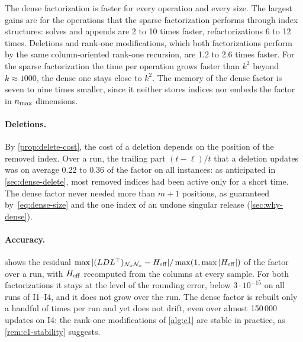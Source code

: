 The dense factorization is faster for every operation and every size. The largest gains are
for the operations that the sparse factorization performs through index structures: solves
and appends are 2 to 10 times faster, refactorizations 6 to 12 times. Deletions and rank-one
modifications, which both factorizations perform by the same column-oriented rank-one
recursion, are 1.2 to 2.6 times faster. For the sparse factorization the time per operation
grows faster than $k^2$ beyond $k\approx1000$, the dense one stays close to $k^2$. The memory
of the dense factor is seven to nine times smaller, since it neither stores indices nor embeds
the factor in $n_{\max}$ dimensions.

\paragraph{Deletions.} By \cref{prop:delete-cost}, the cost of a deletion depends on the
position of the removed index. Over a run, the trailing part $(t-\ell)/t$ that a deletion
updates was on average 0.22 to 0.36 of the factor on all instances: as anticipated in
\cref{sec:dense-delete}, most removed indices had been active only for a short time. The
dense factor never needed more than $m+1$ positions, as guaranteed by~\eqref{eq:dense-size} and
the one index of an undone singular release (\cref{sec:why-dense}).

\paragraph{Accuracy.}  shows the residual
$\max|(LDL^\top)_{\mathcal{N}_x\mathcal{N}_x} - H_{\mathrm{eff}}|/\max(1,\max|H_{\mathrm{eff}}|)$ of the factor over a run, with $H_{\mathrm{eff}}$
recomputed from the columns at every sample. For both factorizations it stays at the level of
the rounding error, below $3\cdot10^{-15}$ on all runs of I1--I4, and it does not grow over
the run. The dense factor is rebuilt only a handful of times per run and yet does not drift,
even over almost 150\,000 updates on I4: the rank-one modifications of \cref{alg:c1} are
stable in practice, as \cref{rem:c1-stability} suggests.

